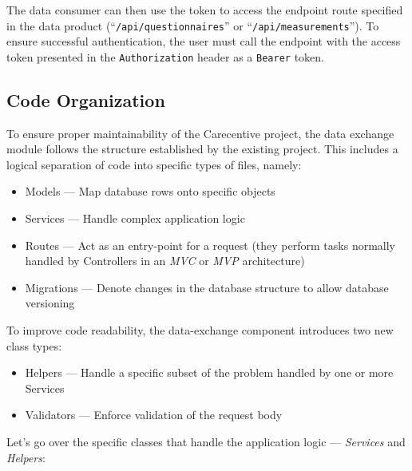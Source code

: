 The data consumer can then use the token to access the endpoint route specified in the data product (``\texttt{/api/questionnaires}'' or ``\texttt{/api/measurements}'').
To ensure successful authentication, the user must call the endpoint with the access token presented in the \texttt{Authorization} header as a \texttt{Bearer} token.

\subsection{Code Organization}\label{subsec:code-organization}

To ensure proper maintainability of the Carecentive project, the data exchange module follows the structure established by the existing project.
This includes a logical separation of code into specific types of files, namely:
\begin{itemize}
    \item Models --- Map database rows onto specific objects
    \item Services --- Handle complex application logic
    \item Routes --- Act as an entry-point for a request (they perform tasks normally handled by Controllers in an \textit{MVC} or \textit{MVP} architecture)
    \item Migrations --- Denote changes in the database structure to allow database versioning
\end{itemize}

To improve code readability, the data-exchange component introduces two new class types:
\begin{itemize}
    \item Helpers --- Handle a specific subset of the problem handled by one or more Services
    \item Validators --- Enforce validation of the request body
\end{itemize}

Let's go over the specific classes that handle the application logic --- \textit{Services} and \textit{Helpers}:

